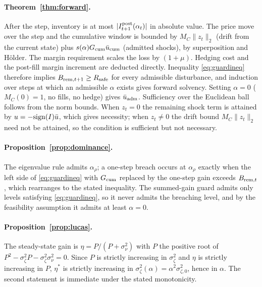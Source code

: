 \paragraph{Theorem~\ref{thm:forward}.} After the step, inventory is at most $|I^{\rm post}_{t+1}(\alpha_t)|$ in absolute value. The price move over the step and the cumulative window is bounded by $M_C\|z_t\|_2$ (drift from the current state) plus $s(\alpha)G_{\rm cum}\bar u_{\rm cum}$ (admitted shocks), by superposition and H\"older. The margin requirement scales the loss by $(1+\mu)$. Hedging cost and the post-fill margin increment are deducted directly. Inequality \eqref{eq:guardineq} therefore implies $B_{{\rm rem},t+1}\ge R_{\rm safe}$ for every admissible disturbance, and induction over steps at which an admissible $\alpha$ exists gives forward solvency. Setting $\alpha=0$ ($M_C(0)=1$, no fills, no hedge) gives $\bar u_{\rm adm}$. Sufficiency over the Euclidean ball follows from the norm bounds. When $z_t=0$ the remaining shock term is attained by $u=-{\rm sign}(I)\bar u$, which gives necessity; when $z_t\ne0$ the drift bound $M_C\|z_t\|_2$ need not be attained, so the condition is sufficient but not necessary.

\paragraph{Proposition~\ref{prop:dominance}.} The eigenvalue rule admits $\alpha_\rho$; a one-step breach occurs at $\alpha_\rho$ exactly when the left side of \eqref{eq:guardineq} with $G_{\rm cum}$ replaced by the one-step gain exceeds $B_{{\rm rem},t}$, which rearranges to the stated inequality. The summed-gain guard admits only levels satisfying \eqref{eq:guardineq}, so it never admits the breaching level, and by the feasibility assumption it admits at least $\alpha=0$.

\paragraph{Proposition~\ref{prop:lucas}.} The steady-state gain is $\eta=P/(P+\sigma_\nu^2)$ with $P$ the positive root of $P^2-\sigma_\zeta^2P-\sigma_\zeta^2\sigma_\nu^2=0$. Since $P$ is strictly increasing in $\sigma_\zeta^2$ and $\eta$ is strictly increasing in $P$, $\eta^*$ is strictly increasing in $\sigma_\zeta^2(\alpha)=\alpha^2\sigma_{\zeta,0}^2$, hence in $\alpha$. The second statement is immediate under the stated monotonicity.

